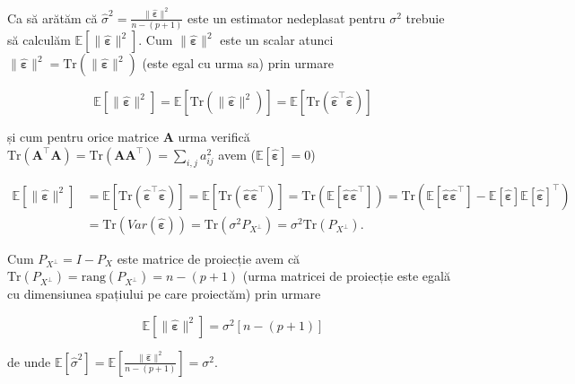 \documentclass[]{article}
\begin{document}
Ca să arătăm că
\(\hat{\sigma}^2 = \frac{\lVert\hat{\boldsymbol \varepsilon}\rVert^2}{n-(p+1)}\)
este un estimator nedeplasat pentru \(\sigma^2\) trebuie să calculăm
\(\mathbb{E}\left[\lVert\hat{\boldsymbol \varepsilon}\rVert^2\right]\).
Cum \(\lVert\hat{\boldsymbol \varepsilon}\rVert^2\) este un scalar
atunci
\(\lVert\hat{\boldsymbol \varepsilon}\rVert^2 = \mathrm{Tr}(\lVert\hat{\boldsymbol \varepsilon}\rVert^2)\)
(este egal cu urma sa) prin urmare

\[
  \mathbb{E}\left[\lVert\hat{\boldsymbol \varepsilon}\rVert^2\right] = \mathbb{E}\left[\mathrm{Tr}\left(\lVert\hat{\boldsymbol \varepsilon}\rVert^2\right)\right] = \mathbb{E}\left[\mathrm{Tr}\left(\hat{\boldsymbol \varepsilon}^\intercal \hat{\boldsymbol \varepsilon}\right)\right]
\]

și cum pentru orice matrice \(\boldsymbol A\) urma verifică
\(\mathrm{Tr}(\boldsymbol A^\intercal \boldsymbol A) = \mathrm{Tr}(\boldsymbol A\boldsymbol A^\intercal) = \sum_{i,j}a_{ij}^2\)
avem (\(\mathbb{E}\left[\hat{\boldsymbol \varepsilon}\right] = 0\))

\begin{align*}
  \mathbb{E}\left[\lVert\hat{\boldsymbol \varepsilon}\rVert^2\right] &= \mathbb{E}\left[\mathrm{Tr}\left(\hat{\boldsymbol \varepsilon}^\intercal \hat{\boldsymbol \varepsilon}\right)\right] = \mathbb{E}\left[\mathrm{Tr}\left(\hat{\boldsymbol \varepsilon} \hat{\boldsymbol \varepsilon}^\intercal\right)\right] = \mathrm{Tr}\left(\mathbb{E}\left[\hat{\boldsymbol \varepsilon} \hat{\boldsymbol \varepsilon}^\intercal\right]\right) = \mathrm{Tr}\left(\mathbb{E}\left[\hat{\boldsymbol \varepsilon} \hat{\boldsymbol \varepsilon}^\intercal\right] - \mathbb{E}\left[\hat{\boldsymbol \varepsilon}\right]\mathbb{E}\left[\hat{\boldsymbol \varepsilon}\right]^\intercal\right) \\
  &= \mathrm{Tr}\left(Var(\hat{\boldsymbol \varepsilon})\right) = \mathrm{Tr}\left(\sigma^2 P_{X^\perp}\right) = \sigma^2 \mathrm{Tr}\left( P_{X^\perp}\right). 
\end{align*}

Cum \(P_{X^\perp} = I - P_{X}\) este matrice de proiecție avem că
\(\mathrm{Tr}\left( P_{X^\perp}\right) = \textrm{rang}\left( P_{X^\perp}\right) = n - (p+1)\)
(urma matricei de proiecție este egală cu dimensiunea spațiului pe care
proiectăm) prin urmare

\[
  \mathbb{E}\left[\lVert\hat{\boldsymbol \varepsilon}\rVert^2\right] = \sigma^2 \left[n - (p+1)\right]
\]

de unde
\(\mathbb{E}\left[\hat{\sigma}^2\right] = \mathbb{E}\left[\frac{\lVert\hat{\boldsymbol \varepsilon}\rVert^2}{n-(p+1)}\right] = \sigma^2\).
\end{document}
